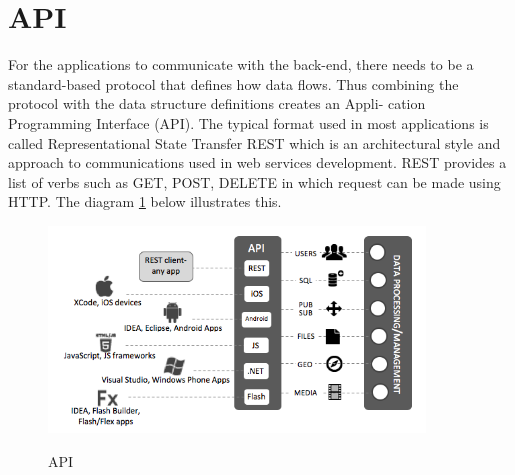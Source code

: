 \section{API}

For the applications to communicate with the back-end, there needs to be a standard-based protocol that defines how data flows. Thus combining the protocol with the data structure definitions creates an Appli- cation Programming Interface (API). The typical format used in most applications is called Representational State Transfer REST which is an architectural style and approach to communications used in web services development. REST provides a list of verbs such as GET, POST, DELETE in which request can be made using HTTP. The diagram \ref{fig:api} below illustrates this.

\begin{figure}[!h]
    \caption{API \cite{backendless}}
    \centering
    \includegraphics[width=100mm]{images/baas-apis}
    \label{fig:api}
\end{figure}


